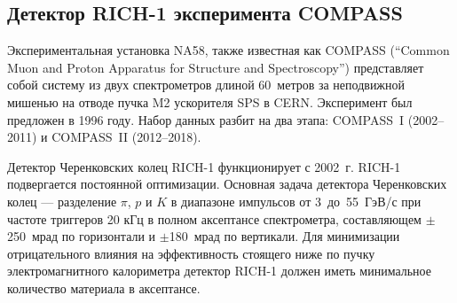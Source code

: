 \subsection{Детектор \mbox{RICH-1} эксперимента COMPASS}\label{sec:CompassRich1}



Экспериментальная установка NA58, также известная как COMPASS (``Common Muon and Proton Apparatus for Structure and Spectroscopy'') представляет собой систему из двух спектрометров длиной 60~метров за неподвижной мишенью на отводе пучка M2 ускорителя SPS в CERN. Эксперимент был предложен в 1996 году. Набор данных разбит на два этапа: \mbox{COMPASS I} (2002--2011) и \mbox{COMPASS II} (2012--2018).




Детектор Черенковских колец \mbox{RICH-1} функционирует с 2002~г. \mbox{RICH-1} подвергается постоянной оптимизации.
Основная задача детектора Черенковских колец --- разделение $\pi$, $p$ и $K$ в диапазоне импульсов от 3~до~55~ГэВ/с при частоте триггеров 20 кГц в полном аксептансе спектрометра, составляющем $\pm$250~мрад по горизонтали и $\pm$180~мрад по вертикали. Для минимизации отрицательного влияния на эффективность стоящего ниже по пучку электромагнитного калориметра детектор \mbox{RICH-1} должен иметь минимальное количество материала в аксептансе.

